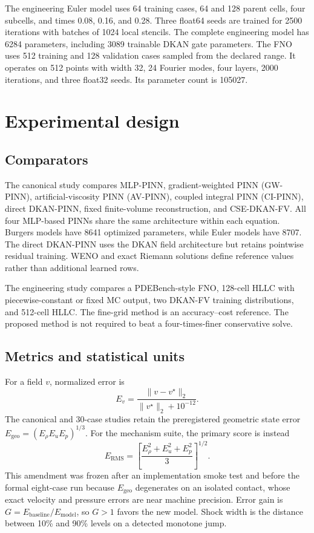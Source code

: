 \documentclass[10pt,twocolumn]{article}
\newcommand{\method}{CSE-DKAN-FV}
\begin{document}
The engineering Euler model uses 64 training cases, 64 and 128 parent cells, four subcells, and times 0.08, 0.16, and 0.28. Three float64 seeds are trained for 2500 iterations with batches of 1024 local stencils. The complete engineering model has 6284 parameters, including 3089 trainable DKAN gate parameters. The FNO uses 512 training and 128 validation cases sampled from the declared range. It operates on 512 points with width 32, 24 Fourier modes, four layers, 2000 iterations, and three float32 seeds. Its parameter count is 105027.

\section{Experimental design}

\subsection{Comparators}

The canonical study compares MLP-PINN, gradient-weighted PINN (GW-PINN), artificial-viscosity PINN (AV-PINN), coupled integral PINN (CI-PINN), direct DKAN-PINN, fixed finite-volume reconstruction, and \method{}. All four MLP-based PINNs share the same architecture within each equation. Burgers models have 8641 optimized parameters, while Euler models have 8707. The direct DKAN-PINN uses the DKAN field architecture but retains pointwise residual training. WENO and exact Riemann solutions define reference values rather than additional learned rows.

The engineering study compares a PDEBench-style FNO, 128-cell HLLC with piecewise-constant or fixed MC output, two DKAN-FV training distributions, and 512-cell HLLC. The fine-grid method is an accuracy--cost reference. The proposed method is not required to beat a four-times-finer conservative solve.

\subsection{Metrics and statistical units}

For a field $v$, normalized error is
\begin{equation}
 E_v=\frac{\lVert v-v^\star\rVert_2}{\lVert v^\star\rVert_2+10^{-12}}.
\end{equation}
The canonical and 30-case studies retain the preregistered geometric state error $E_{\mathrm{geo}}=(E_\rho E_u E_p)^{1/3}$. For the mechanism suite, the primary score is instead
\begin{equation}
 E_{\mathrm{RMS}}=\left[\frac{E_\rho^2+E_u^2+E_p^2}{3}\right]^{1/2}.
 \label{eq:rmsmetric}
\end{equation}
This amendment was frozen after an implementation smoke test and before the formal eight-case run because $E_{\mathrm{geo}}$ degenerates on an isolated contact, whose exact velocity and pressure errors are near machine precision. Error gain is $G=E_{\mathrm{baseline}}/E_{\mathrm{model}}$, so $G>1$ favors the new model. Shock width is the distance between 10\% and 90\% levels on a detected monotone jump.
\end{document}
